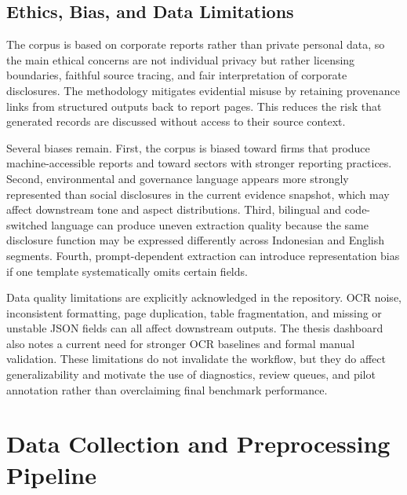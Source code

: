 \subsection{Ethics, Bias, and Data Limitations}

The corpus is based on corporate reports rather than private personal data, so the main ethical concerns are not individual privacy but rather licensing boundaries, faithful source tracing, and fair interpretation of corporate disclosures. The methodology mitigates evidential misuse by retaining provenance links from structured outputs back to report pages. This reduces the risk that generated records are discussed without access to their source context.

Several biases remain. First, the corpus is biased toward firms that produce machine-accessible reports and toward sectors with stronger reporting practices. Second, environmental and governance language appears more strongly represented than social disclosures in the current evidence snapshot, which may affect downstream tone and aspect distributions. Third, bilingual and code-switched language can produce uneven extraction quality because the same disclosure function may be expressed differently across Indonesian and English segments. Fourth, prompt-dependent extraction can introduce representation bias if one template systematically omits certain fields.

Data quality limitations are explicitly acknowledged in the repository. OCR noise, inconsistent formatting, page duplication, table fragmentation, and missing or unstable JSON fields can all affect downstream outputs. The thesis dashboard also notes a current need for stronger OCR baselines and formal manual validation. These limitations do not invalidate the workflow, but they do affect generalizability and motivate the use of diagnostics, review queues, and pilot annotation rather than overclaiming final benchmark performance.

\section{Data Collection and Preprocessing Pipeline}

